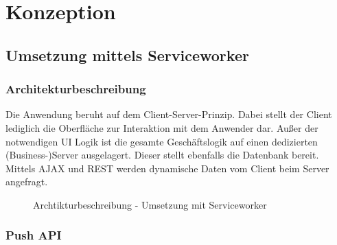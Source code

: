 \chapter{Konzeption}
\label{sec_konzeption}

\section{Umsetzung mittels Serviceworker}
\label{subsec_konzeption_serviceworker}

\subsection{Architekturbeschreibung}
\label{subsubsec_konzeption_serviceworker_architektur}

Die Anwendung beruht auf dem Client-Server-Prinzip. Dabei stellt der Client lediglich die Oberfläche zur Interaktion mit dem Anwender dar. Außer der notwendigen UI Logik ist die gesamte Geschäftslogik auf einen dedizierten (Business-)Server ausgelagert. Dieser stellt ebenfalls die Datenbank bereit. Mittels AJAX und REST werden dynamische Daten vom Client beim Server angefragt.

\begin{figure}[htp] 
\caption{Archtikturbeschreibung - Umsetzung mit Serviceworker}
\label{image_architektur-serviceworker-push}
\end{figure} 

\newpage
\subsection{Push API}
\label{subsubsec_konzeption_serviceworker_push-api}

